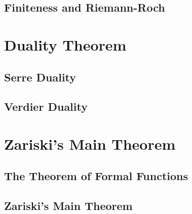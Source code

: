         \subsection{Finiteness and Riemann-Roch}

    \section{Duality Theorem}
        \subsection{Serre Duality}

        \subsection{Verdier Duality}

    \section{Zariski's Main Theorem}
        \subsection{The Theorem of Formal Functions}

        \subsection{Zariski's Main Theorem}
    
    \printbibliography

